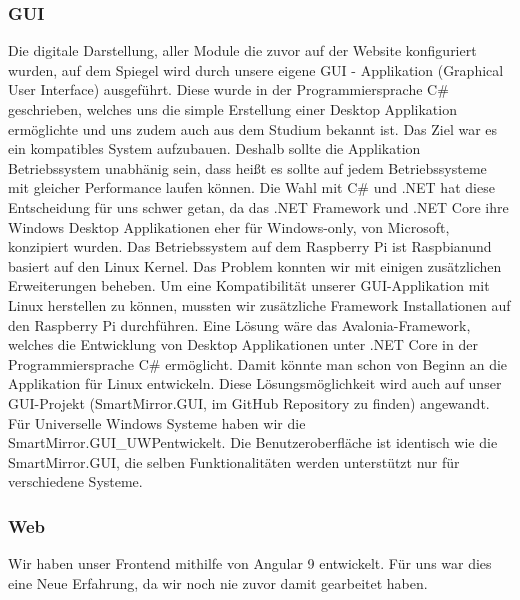 \subsubsection{GUI}
Die digitale Darstellung, aller Module die zuvor auf der Website konfiguriert wurden, auf dem Spiegel wird durch unsere eigene GUI - Applikation (\dq Graphical User Interface\dq ) ausgeführt. Diese wurde in der Programmiersprache C\# geschrieben, welches uns die simple Erstellung einer Desktop Applikation ermöglichte und uns zudem auch aus dem Studium bekannt ist. 
Das Ziel war es ein kompatibles System aufzubauen. Deshalb sollte die Applikation Betriebssystem unabhänig sein, dass heißt es sollte auf jedem Betriebssysteme mit gleicher Performance laufen können. Die Wahl mit C\# und .NET hat diese Entscheidung für uns schwer getan, da das .NET Framework und .NET Core ihre Windows Desktop Applikationen eher für \dq Windows-only\dq , von Microsoft, konzipiert wurden. Das Betriebssystem auf dem Raspberry Pi ist \dq Raspbian\dq  und basiert auf den Linux Kernel. Das Problem konnten wir mit einigen zusätzlichen Erweiterungen beheben. Um eine Kompatibilität unserer GUI-Applikation mit Linux herstellen zu können, mussten wir zusätzliche Framework Installationen auf den Raspberry Pi durchführen. 
Eine Lösung wäre das \dq Avalonia-Framework\dq , welches die Entwicklung von Desktop Applikationen unter .NET Core in der Programmiersprache C\# ermöglicht. Damit könnte man schon von Beginn an die Applikation für Linux entwickeln. Diese Lösungsmöglichkeit wird auch auf unser GUI-Projekt (\dq SmartMirror.GUI\dq , im GitHub Repository zu finden) angewandt. 
Für Universelle Windows Systeme haben wir die \dq SmartMirror.GUI\_UWP\dq  entwickelt. Die Benutzeroberfläche ist identisch wie die SmartMirror.GUI, die selben Funktionalitäten werden unterstützt nur für verschiedene Systeme.

\subsubsection{Web}
Wir haben unser Frontend mithilfe von Angular 9 entwickelt. Für uns war dies eine Neue Erfahrung, da wir noch nie zuvor damit gearbeitet haben.